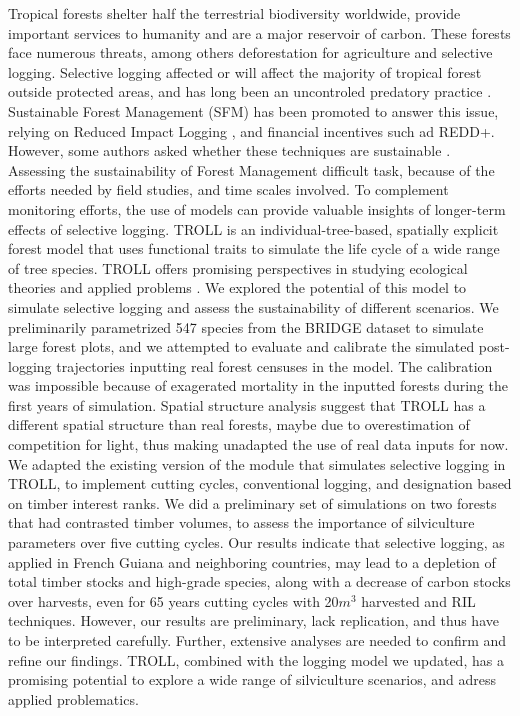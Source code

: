 \documentclass[12pt,]{article}
\theoremstyle{definition}
\theoremstyle{definition}
\theoremstyle{definition}
\theoremstyle{remark}
\begin{document}
Tropical forests shelter half the terrestrial biodiversity worldwide,
provide important services to humanity and are a major reservoir of
carbon. These forests face numerous threats, among others deforestation
for agriculture and selective logging. Selective logging affected or
will affect the majority of tropical forest outside protected areas, and
has long been an uncontroled predatory practice \citep{Nasi2009}.
Sustainable Forest Management (SFM) has been promoted to answer this
issue, relying on Reduced Impact Logging \citep[RIL,][]{Putz2008}, and
financial incentives such ad REDD+. However, some authors asked whether
these techniques are sustainable \citep{Kormos2012, Pearce2003}.
Assessing the sustainability of Forest Management difficult task,
because of the efforts needed by field studies, and time scales
involved. To complement monitoring efforts, the use of models can
provide valuable insights of longer-term effects of selective logging.
TROLL is an individual-tree-based, spatially explicit forest model that
uses functional traits to simulate the life cycle of a wide range of
tree species. TROLL offers promising perspectives in studying ecological
theories and applied problems
\citep[\citet{Chave1999b}]{Marechaux2017a}. We explored the potential of
this model to simulate selective logging and assess the sustainability
of different scenarios. We preliminarily parametrized 547 species from
the BRIDGE dataset \citep{Baraloto2010} to simulate large forest plots,
and we attempted to evaluate and calibrate the simulated post-logging
trajectories inputting real forest censuses in the model. The
calibration was impossible because of exagerated mortality in the
inputted forests during the first years of simulation. Spatial structure
analysis suggest that TROLL has a different spatial structure than real
forests, maybe due to overestimation of competition for light, thus
making unadapted the use of real data inputs for now. We adapted the
existing version of the module that simulates selective logging in
TROLL, to implement cutting cycles, conventional logging, and
designation based on timber interest ranks. We did a preliminary set of
simulations on two forests that had contrasted timber volumes, to assess
the importance of silviculture parameters over five cutting cycles. Our
results indicate that selective logging, as applied in French Guiana and
neighboring countries, may lead to a depletion of total timber stocks
and high-grade species, along with a decrease of carbon stocks over
harvests, even for 65 years cutting cycles with 20\(m^3\) harvested and
RIL techniques. However, our results are preliminary, lack replication,
and thus have to be interpreted carefully. Further, extensive analyses
are needed to confirm and refine our findings. TROLL, combined with the
logging model we updated, has a promising potential to explore a wide
range of silviculture scenarios, and adress applied problematics.
\end{document}

